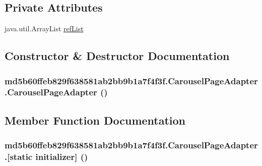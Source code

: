 \subsection*{Private Attributes}
\begin{CompactItemize}
\item 
java.util.ArrayList \hyperlink{classmd5b60ffeb829f638581ab2bb9b1a7f4f3f_1_1_carousel_page_adapter_a22f5798ddaa23eeeb67082001d53a19}{refList}
\end{CompactItemize}


\subsection{Constructor \& Destructor Documentation}
\hypertarget{classmd5b60ffeb829f638581ab2bb9b1a7f4f3f_1_1_carousel_page_adapter_9f5b0766bf8480cc782853f50eed5713}{
\subsubsection[{CarouselPageAdapter}]{\setlength{\rightskip}{0pt plus 5cm}md5b60ffeb829f638581ab2bb9b1a7f4f3f.CarouselPageAdapter.CarouselPageAdapter ()}}
\label{classmd5b60ffeb829f638581ab2bb9b1a7f4f3f_1_1_carousel_page_adapter_9f5b0766bf8480cc782853f50eed5713}




\subsection{Member Function Documentation}
\hypertarget{classmd5b60ffeb829f638581ab2bb9b1a7f4f3f_1_1_carousel_page_adapter_8bcd4cba6272a77c65f448167da6b36d}{
\subsubsection[{[static initializer]}]{\setlength{\rightskip}{0pt plus 5cm}md5b60ffeb829f638581ab2bb9b1a7f4f3f.CarouselPageAdapter.\mbox{[}static initializer\mbox{]} ()}}
\label{classmd5b60ffeb829f638581ab2bb9b1a7f4f3f_1_1_carousel_page_adapter_8bcd4cba6272a77c65f448167da6b36d}


